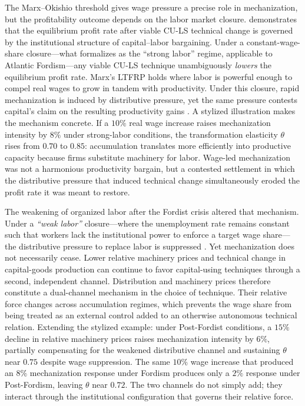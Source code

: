 The Marx--Okishio threshold gives wage pressure a precise role
in mechanization, but the profitability outcome depends on the
labor market closure. \citet{Basu2026} demonstrates that the
equilibrium profit rate after viable CU-LS technical change is
governed by the institutional structure of capital--labor
bargaining. Under a constant-wage-share closure---what
\citet{Basu2026} formalizes as the ``strong labor'' regime,
applicable to Atlantic Fordism---any viable CU-LS technique
unambiguously \textit{lowers} the equilibrium profit rate.
Marx's LTFRP holds where labor is powerful
enough to compel real wages to grow in tandem with productivity.
Under this closure, rapid mechanization is induced by
distributive pressure, yet the same pressure contests capital's
claim on the resulting productivity gains
\citep{Vidal2015, Vidal2019}. A stylized illustration makes the
mechanism concrete. If a $10\%$ real wage increase raises
mechanization intensity by $8\%$ under strong-labor conditions,
the transformation elasticity $\theta$ rises from $0.70$ to
$0.85$: accumulation translates more efficiently into productive
capacity because firms substitute machinery for labor. Wage-led
mechanization was not a harmonious productivity bargain, but a
contested settlement in which the distributive pressure that
induced technical change simultaneously eroded the profit rate
it was meant to restore.

The weakening of organized labor after the Fordist crisis
altered that mechanism. Under a \textit{``weak labor''} closure---where
the unemployment rate remains constant such that workers lack the
institutional power to enforce a target wage share---the
distributive pressure to replace labor is suppressed
\citep{Basu2026}. Yet mechanization does not necessarily cease. Lower
relative machinery prices and technical change in capital-goods
production can continue to favor capital-using techniques through a
second, independent channel. Distribution and machinery prices
therefore constitute a dual-channel mechanism in the
choice of technique. Their relative force changes across
accumulation regimes, which prevents the wage share from being
treated as an external control added to an otherwise autonomous
technical relation. Extending the stylized example: under
Post-Fordist conditions, a $15\%$ decline in relative machinery
prices raises mechanization intensity by $6\%$, partially
compensating for the weakened distributive channel and
sustaining $\theta$ near $0.75$ despite wage suppression. The
same $10\%$ wage increase that produced an $8\%$ mechanization
response under Fordism produces only a $2\%$ response under
Post-Fordism, leaving $\theta$ near $0.72$. The two channels do
not simply add; they interact through the institutional
configuration that governs their relative force.


